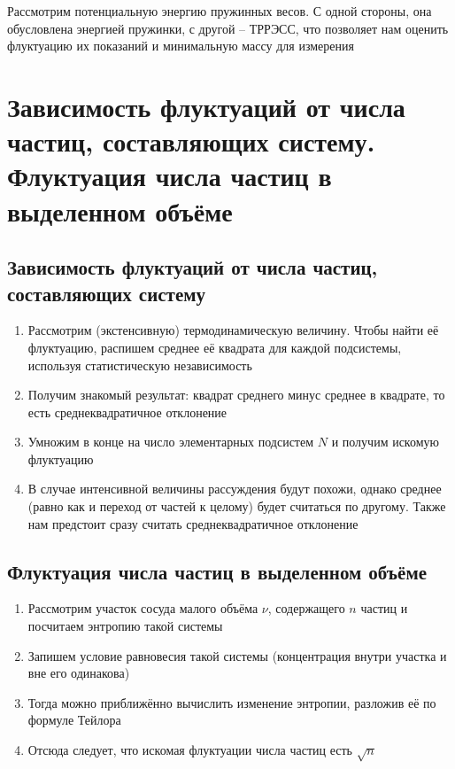 \documentclass[a4paper, 14pt]{article}
\begin{document}
    Рассмотрим потенциальную энергию пружинных весов.
    С одной стороны, она обусловлена энергией пружинки, с другой -- ТРРЭСС, что позволяет нам оценить флуктуацию
    их показаний и минимальную массу для измерения

    \section{Зависимость флуктуаций от числа частиц, составляющих систему.
    Флуктуация числа частиц в выделенном объёме}

    \subsection{Зависимость флуктуаций от числа частиц, составляющих систему}

    \begin{enumerate}
        \item Рассмотрим (экстенсивную) термодинамическую величину.
        Чтобы найти её флуктуацию, распишем среднее её квадрата для каждой подсистемы, используя статистическую
        независимость
        \item Получим знакомый результат: квадрат среднего минус среднее в квадрате, то есть среднеквадратичное
        отклонение
        \item Умножим в конце на число элементарных подсистем $N$ и получим искомую флуктуацию
        \item В случае интенсивной величины рассуждения будут похожи, однако среднее (равно как и переход от частей
        к целому) будет считаться по другому.
        Также нам предстоит сразу считать среднеквадратичное отклонение
    \end{enumerate}

    \subsection{Флуктуация числа частиц в выделенном объёме}

    \begin{enumerate}
        \item Рассмотрим участок сосуда малого объёма $\nu$, содержащего $n$ частиц и посчитаем энтропию такой системы
        \item Запишем условие равновесия такой системы (концентрация внутри участка и вне его одинакова)
        \item Тогда можно приближённо вычислить изменение энтропии, разложив её по формуле Тейлора
        \item Отсюда следует, что искомая флуктуации числа частиц есть $\sqrt{n}$
    \end{enumerate}
\end{document}
